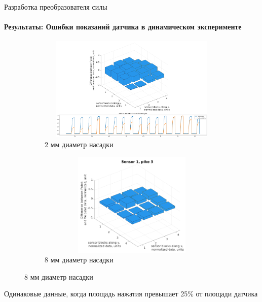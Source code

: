 \documentclass[aspectratio=169,xcolor=table]{beamer}
\begin{document}
\begin{frame}[t]{Разработка преобразователя силы}
    \framesubtitle{Результаты: Ошибки показаний датчика в динамическом эксперименте}
    \vspace{-15pt}
    \begin{figure}[H]
        \begin{subfigure}{0.64\textwidth}
            \centering\includegraphics[height=5cm,width=1\textwidth,keepaspectratio]{sens1_pike1_mod.png}
            \caption*{2 мм диаметр насадки}
            \label{fig:sens1_pike1}
        \end{subfigure}
        \begin{subfigure}{0.34\textwidth}
            \centering\includegraphics[height=5cm,width=1\textwidth,keepaspectratio]{sens1_pike3.png}
            \caption*{8 мм диаметр насадки}
            \label{fig:sens1_pike3}
        \end{subfigure}
    \end{figure}
    \vspace{-0.8cm}
    \alert{Одинаковые данные, когда площадь нажатия превышает 25\% от площади датчика}
\end{frame}
\end{document}
